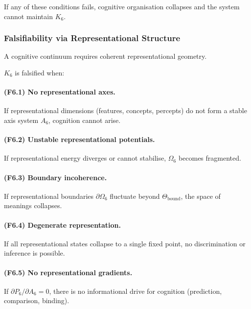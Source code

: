 If any of these conditions fails, cognitive organisation collapses
and the system cannot maintain $K_6$.



\subsubsection{Falsifiability via Representational Structure}

A cognitive continuum requires coherent representational geometry.

$K_6$ is falsified when:

\paragraph{(F6.1) No representational axes.}
If representational dimensions (features, concepts, percepts)
do not form a stable axis system $A_6$,
cognition cannot arise.

\paragraph{(F6.2) Unstable representational potentials.}
If representational energy diverges or cannot stabilise,
$\Omega_6$ becomes fragmented.

\paragraph{(F6.3) Boundary incoherence.}
If representational boundaries $\partial\Omega_6$ fluctuate beyond
$\Theta_{\mathrm{bound}}$, the space of meanings collapses.

\paragraph{(F6.4) Degenerate representation.}
If all representational states collapse to a single fixed point,
no discrimination or inference is possible.

\paragraph{(F6.5) No representational gradients.}
If $\partial P_6 / \partial A_6 = 0$, there is no informational drive
for cognition (prediction, comparison, binding).



